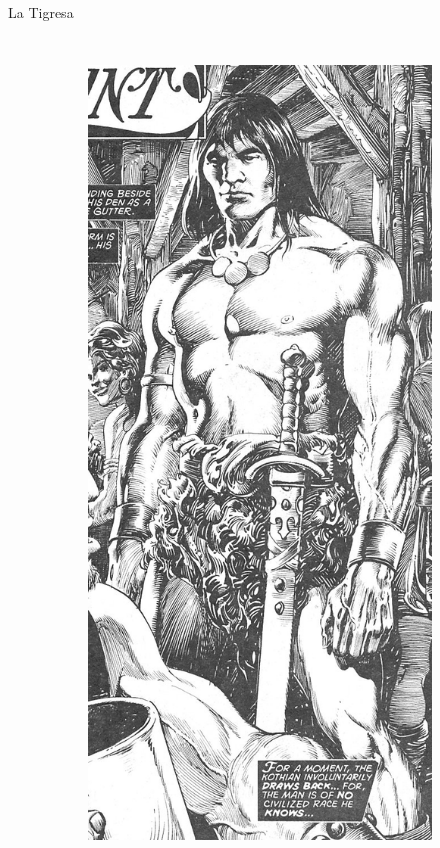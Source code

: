 \begin{frame}{La Tigresa}
\begin{columns}
\begin{figure}[htp]
\begin{subfigure}[b]{0.23\textwidth}
				\includegraphics[width=\textwidth]{img/conan/TSSC}
			\end{subfigure}
		\end{figure}
	\end{columns}
\end{frame}
\note[itemize]{
	\item
}


